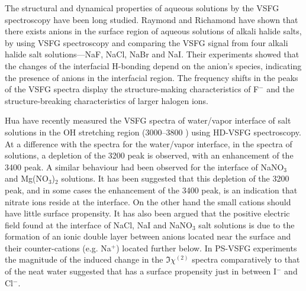 The structural and dynamical properties of aqueous solutions by the VSFG spectroscopy have been long studied. 
Raymond and Richamond\cite{Raymond2004} have shown that there exists anions in the surface region of aqueous solutions of alkali halide salts, 
by using VSFG spectroscopy and comparing the VSFG signal from four alkali halide salt solutions---NaF, NaCl, NaBr 
and NaI. Their experiments showed that the changes of the interfacial H-bonding depend on the anion's species, 
indicating the presence of anions in the interfacial region. The frequency shifts in the peaks of the VSFG spectra display the structure-making characteristics
of F$^-$ and the structure-breaking characteristics of larger halogen ions.

%
Hua \etal\cite{HuaWei2014} have recently measured the VSFG spectra of water/vapor interface of \LiN salt solutions in the OH stretching region
(3000--3800 \centimeter) using HD-VSFG spectroscopy\cite{HuaWei2011,HuaWei2011b,ChenXiangKe2010}. 
At a difference with the spectra for the water/vapor interface, in the spectra of 
\LiN solutions, a depletion of the 3200 \cm peak is observed, with an 
enhancement of the 3400 \cm peak.
A similar behaviour had been observed for the interface of NaNO$_3$ and 
Mg(NO$_3$)$_2$ solutions\cite{AJ12,HuaWei2014}. It has been 
suggested that this depletion of the 3200 \cm peak, and in some cases 
the enhancement of the 3400 \cm peak, is an indication that nitrate 
ions reside at the interface. On the other hand the small 
cations should have little surface propensity. 
It has also been argued that the positive electric field found at the interface of NaCl, NaI and 
NaNO$_3$ salt solutions is due to the formation of an ionic double layer 
between anions located near the surface and their counter-cations (e.g.
Na$^+$) located further below. In PS-VSFG experiments the 
magnitude of the induced change in the $\Im\chi^{(2)}$ spectra comparatively
to that of the neat water suggested that \nitrate has a surface propensity 
just in between I$^-$ and Cl$^-$\cite{Verreault2013,Verreault2009}. 



